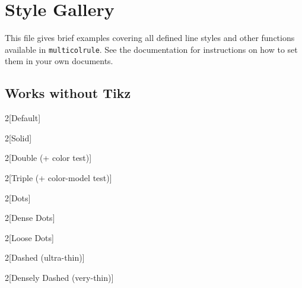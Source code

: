 \documentclass{article}
\begin{document}
\section*{Style Gallery}
This file gives brief examples covering all defined line styles and
other functions available in \texttt{multicolrule}. See the documentation
for instructions on how to set them in your own documents.

\subsection*{Works without Tikz}
\begin{multicols}{2}[Default]
\lipsum[1]
\end{multicols}

\begin{multicols}{2}[Solid]
  \lipsum[1]
\end{multicols}

\begin{multicols}{2}[Double (+ color test)]
  \lipsum[1]
\end{multicols}

\begin{multicols}{2}[Triple (+ color-model test)]
  \lipsum[1]
\end{multicols}

\begin{multicols}{2}[Dots]
  \lipsum[1]
\end{multicols}

\begin{multicols}{2}[Dense Dots]
  \lipsum[1]
\end{multicols}

\begin{multicols}{2}[Loose Dots]
  \lipsum[1]
\end{multicols}

\begin{multicols}{2}[Dashed (ultra-thin)]
  \lipsum[1]
\end{multicols}

\begin{multicols}{2}[Densely Dashed (very-thin)]
  \lipsum[1]
\end{multicols}
\end{document}
